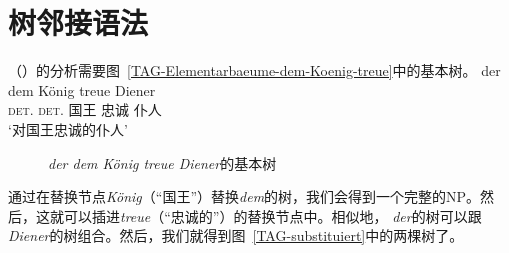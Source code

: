 \section{树邻接语法}

（）的分析需要图~\vref{TAG-Elementarbaeume-dem-Koenig-treue}中的基本树。
\ea
\gll der        dem        König treue Diener\\
     \textsc{det}.\nom{} \textsc{det}.\dat{} 国王  忠诚 仆人\\
\glt `对国王忠诚的仆人'
\z

\begin{figure}
\hfill
{}
\hfill
{}
\hfill
{}
%
\hfill
%
%
\hfill
%
\hfill\mbox{}
\caption{\label{TAG-Elementarbaeume-dem-Koenig-treue}\emph{der dem König treue Diener}的基本树}
\end{figure}%

\noindent
通过在替换节点\emph{König}（“国王”）替换\emph{dem}的树，我们会得到一个完整的NP。然后，这就可以插进\emph{treue}（“忠诚的”）的替换节点中。相似地， \emph{der}的树可以跟\emph{Diener}的树组合。然后，我们就得到图~\vref{TAG-substituiert}中的两棵树了。

